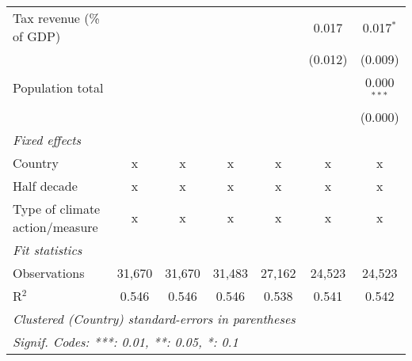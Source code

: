 \begin{tabular}{lcccccc}
   Tax revenue (\% of GDP)                         &         &         &             &             & 0.017        & 0.017$^{*}$\\   
                                                   &         &         &             &             & (0.012)      & (0.009)\\   
   Population total                                &         &         &             &             &              & 0.000$^{***}$\\   
                                                   &         &         &             &             &              & (0.000)\\   
   \emph{Fixed effects}\\
   Country                                         & x       & x       & x           & x           & x            & x\\  
   Half decade                                     & x       & x       & x           & x           & x            & x\\  
   Type of climate action/measure                  & x       & x       & x           & x           & x            & x\\  
   \midrule \emph{Fit statistics}\\
   Observations                                    & 31,670  & 31,670  & 31,483      & 27,162      & 24,523       & 24,523\\  
   R$^2$                                           & 0.546   & 0.546   & 0.546       & 0.538       & 0.541        & 0.542\\  
   \midrule
   \multicolumn{7}{l}{\emph{Clustered (Country) standard-errors in parentheses}}\\
   \multicolumn{7}{l}{\emph{Signif. Codes: ***: 0.01, **: 0.05, *: 0.1}}\\
\end{tabular}
\par\endgroup


